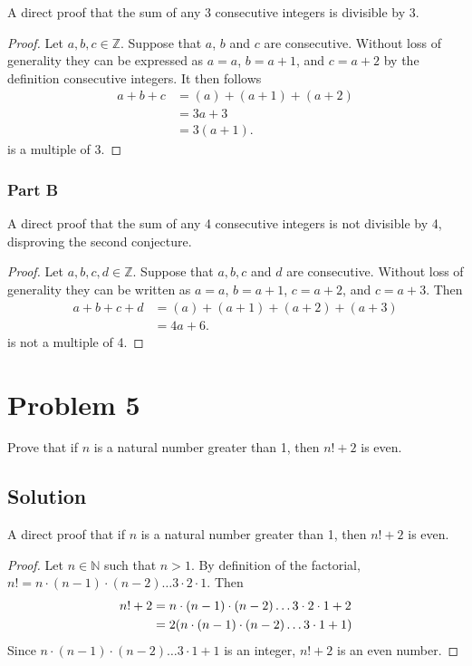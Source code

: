 \documentclass[12pt]{extarticle}
\begin{document}
A direct proof that the sum of any 3 consecutive integers is divisible by 3.
\begin{proof}
	Let $a,b,c \in \mathbb{Z}$. Suppose that $a$, $b$ and $c$ are consecutive. Without loss of generality they can be expressed as $a = a$, $b = a+1$, and $c = a+2$ by the definition consecutive integers. It then follows
	\begin{align*}
		a + b + c &= (a) + (a+1) + (a+2) \\
		&= 3a + 3 \\
		&= 3(a+1).
	\end{align*}
	is a multiple of 3.
\end{proof}

\subsubsection*{Part B}

A direct proof that the sum of any 4 consecutive integers is not divisible by 4, disproving the second conjecture.
\begin{proof}
	Let $a,b,c,d \in \mathbb{Z}$. Suppose that $a,b,c$ and $d$ are consecutive. Without loss of generality they can be written as $a = a$, $b = a+1$, $c = a+2$, and $c = a+3$. Then
	\begin{align*}
		a + b + c + d &= (a) + (a+1) + (a+2) + (a+3) \\
									&= 4a + 6.
	\end{align*}
	is not a multiple of 4.
\end{proof}

\section*{Problem 5}

Prove that if $n$ is a natural number greater than 1, then $n! + 2$ is even.

\subsection*{Solution}

A direct proof that if $n$ is a natural number greater than 1, then $n! + 2$ is even.
\begin{proof}
	Let $n \in \mathbb{N}$ such that $n > 1$. By definition of the factorial, $n! = n \cdot (n-1) \cdot (n-2)\ldots 3 \cdot 2 \cdot 1$. Then
	\begin{align*}
		n! + 2 &= n \cdot (n-1) \cdot (n-2)\ldots 3 \cdot 2 \cdot 1 + 2 \\
					 &= 2 \qty(n \cdot (n-1) \cdot (n-2)\ldots 3 \cdot 1 + 1)
	\end{align*}
	Since $n \cdot (n-1) \cdot (n-2)\ldots 3 \cdot 1 + 1$ is an integer, $n! + 2$	 is an even number.
\end{proof}
\end{document}

